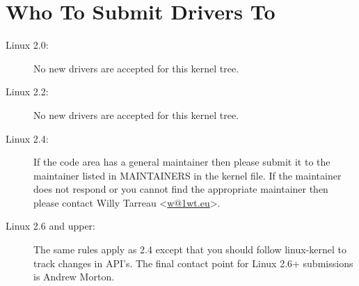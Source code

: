 \documentclass[a4paper,8pt,english]{sphinxmanual}
\begin{document}
\section{Who To Submit Drivers To}
\label{process/submitting-drivers:who-to-submit-drivers-to}\begin{description}
\item[{Linux 2.0:}] \leavevmode
No new drivers are accepted for this kernel tree.

\item[{Linux 2.2:}] \leavevmode
No new drivers are accepted for this kernel tree.

\item[{Linux 2.4:}] \leavevmode
If the code area has a general maintainer then please submit it to
the maintainer listed in MAINTAINERS in the kernel file. If the
maintainer does not respond or you cannot find the appropriate
maintainer then please contact Willy Tarreau \textless{}\href{mailto:w@1wt.eu}{w@1wt.eu}\textgreater{}.

\item[{Linux 2.6 and upper:}] \leavevmode
The same rules apply as 2.4 except that you should follow linux-kernel
to track changes in API's. The final contact point for Linux 2.6+
submissions is Andrew Morton.

\end{description}
\end{document}
